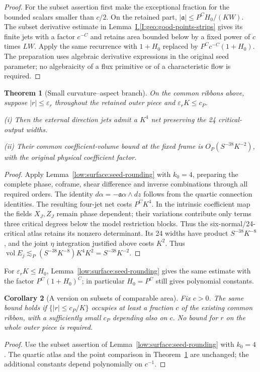 \documentclass[11pt]{amsart}
\newtheorem{theorem}{Theorem}[section]
\newtheorem{corollary}[theorem]{Corollary}
\theoremstyle{definition}
\theoremstyle{remark}
\numberwithin{equation}{section}
\newcommand{\partIref}[1]{\hyperref[I:#1]{I.\ref*{I:#1}}}
\begin{document}
\begin{proof}
For the subset assertion first make the exceptional fraction for the bounded scalars smaller than $c/2$. On the retained part, $|\mathfrak a|\le P^CH_0/(KW)$. The subset derivative estimate in Lemma~\partIref{geo:good-points-strips} gives its finite jets with a factor $c^{-C}$ and retains area bounded below by a fixed power of $c$ times $LW$. Apply the same recurrence with $1+H_0$ replaced by $P^Cc^{-C}(1+H_0)$. The preparation uses algebraic derivative expressions in the original seed parameter; no algebraicity of a flux primitive or of a characteristic flow is required.
\end{proof}

\begin{theorem}[Small curvature--aspect branch]\label{low:4:sf:thm:smallaspect}
On the common ribbons above, suppose $|r|\le\varepsilon_r$ throughout the retained outer piece and $\varepsilon_r K\le c_P$.

\noindent\textup{(i)} Then the external direction jets admit a $K^4$ net preserving the 24 critical-output widths.

\noindent\textup{(ii)} Their common coefficient-volume bound at the fixed frame is $O_P(S^{-38}K^{-2})$, with the original physical coefficient factor.
\end{theorem}
\begin{proof}
Apply Lemma~\ref{low:surface:seed-rounding} with $k_0=4$, preparing the complete phase, coframe, shear difference and inverse combinations through all required orders. The identity $d\alpha=-\mathfrak a\alpha\wedge dz$ follows from the quartic connection identities. The resulting four-jet net costs $P^CK^4$. In the intrinsic coefficient map the fields $X_J,Z_J$ remain phase dependent; their variations contribute only terms three critical degrees below the model restriction blocks. Thus the six-normal/24-critical atlas retains its nonzero determinant. Its 24 widths have product $S^{-38}K^{-8}$, and the joint $\eta$ integration justified above costs $K^2$. Thus $\operatorname{vol}E_j\lesssim_P(S^{-38}K^{-8})K^4K^2=S^{-38}K^{-2}$.
\end{proof}

For $\varepsilon_rK\le H_0$, Lemma~\ref{low:surface:seed-rounding} gives the same estimate with the factor $P^C(1+H_0)^C$; in particular $H_0=P^C$ still gives polynomial constants.

\begin{corollary}[A version on subsets of comparable area]
Fix $c>0$. The same bound holds if $\{|r|\le c_P/K\}$ occupies at least a fraction $c$ of the existing common ribbon, with a sufficiently small $c_P$ depending also on $c$. No bound for $r$ on the whole outer piece is required.
\end{corollary}
\begin{proof}
Use the subset assertion of Lemma~\ref{low:surface:seed-rounding} with $k_0=4$. The quartic atlas and the point comparison in Theorem~\ref{low:4:sf:thm:smallaspect} are unchanged; the additional constants depend polynomially on $c^{-1}$.
\end{proof}
\end{document}
